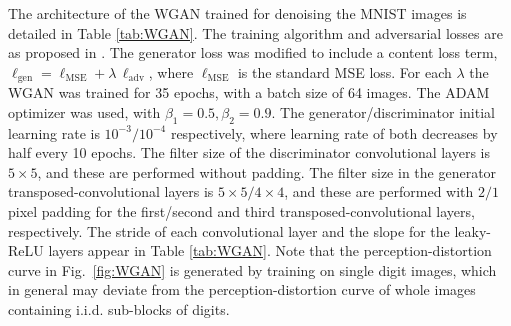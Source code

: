 The architecture of the WGAN trained for denoising the MNIST images is detailed in Table \ref{tab:WGAN}. The training algorithm and adversarial losses are as proposed in \cite{gulrajani2017improved}. The generator loss was modified to include a content loss term, \ie $\ell_{\text{gen}} = \ell_{\text{MSE}} + \lambda \, \ell_{\text{adv}}$, where $\ell_{\text{MSE}}$ is the standard MSE loss. For each $\lambda$ the WGAN was trained for 35 epochs, with a batch size of 64 images. The ADAM optimizer \cite{kingma2017adam} was used, with $\beta_1=0.5, \beta_2=0.9$. The generator\slash discriminator initial learning rate is $10^{-3}\slash 10^{-4}$ respectively, where learning rate of both decreases by half every 10 epochs. The filter size of the discriminator convolutional layers is $5\times 5$, and these are performed without padding. The filter size in the generator transposed-convolutional layers is $5\times 5 \slash 4\times 4$, and these are performed with $2\slash 1$ pixel padding for the first\slash second and third transposed-convolutional layers, respectively. The stride of each convolutional layer and the slope for the leaky-ReLU layers appear in Table \ref{tab:WGAN}. Note that the perception-distortion curve in Fig.~\ref{fig:WGAN} is generated by training on single digit images, which in general may deviate from the perception-distortion curve of  whole images containing i.i.d. sub-blocks of digits.


